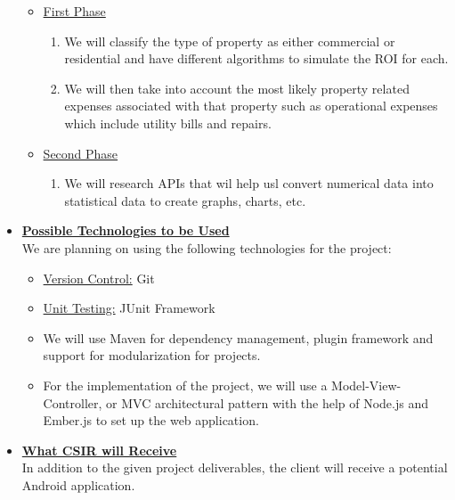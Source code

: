 \documentclass[a4paper,12pt]{article}
\begin{document}
\begin{itemize}
\begin{itemize}
	\item \underline{First Phase}

		\begin{enumerate}
		\item We will classify the type of property as either commercial or residential and have different algorithms to 				simulate the ROI for each. 
		\item We will then take into account the most likely property related expenses associated with that property such 			as operational expenses which include utility bills and repairs.
		\end{enumerate}
	
	\item \underline{Second Phase}

		\begin{enumerate}
		\item We will research APIs that wil help usl convert numerical data into statistical data to create graphs, charts, 				etc.
		\end{enumerate}

	\end{itemize}

\bigskip
\item {\large \underline{\textbf{Possible Technologies to be Used}}}\\[0.2cm]
We are planning on using the following technologies for the project:
	\begin{itemize}
		\item \underline {Version Control:} Git
		\\
		\item  \underline{Unit Testing:} JUnit Framework
		\\
		\item We will use Maven for dependency management, plugin framework and support for modularization for 				projects.
		\\
		\item For the implementation of the project, we will use a Model-View-Controller, or MVC architectural pattern with 			the help of Node.js and Ember.js to set up the web application.
	\end{itemize}

\bigskip
 \item {\large \underline{\textbf{What CSIR will Receive}}}\\[0.2cm]
In addition to the given project deliverables, the client will receive a potential Android application. 
\end{itemize}
\end{document}
